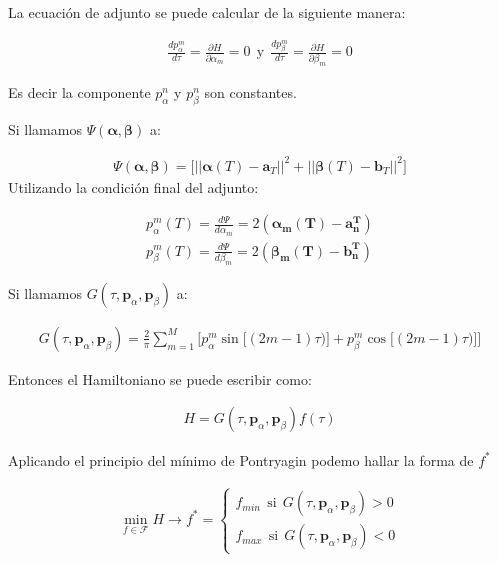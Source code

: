 La ecuación de adjunto se puede calcular de la siguiente manera:

\begin{gather}
    \frac{d p_\alpha^m}{d \tau} = \frac{\partial H }{\partial \alpha_m} = 0 \ \ \text{y} \ \    \frac{d p_\beta^m}{d \tau} = \frac{\partial H }{\partial \beta_m} = 0  
\end{gather}

Es decir la componente $p_\alpha^n$ y $p_\beta^n$ son constantes.
\newline

Si llamamos $\Psi(\bm{\alpha},\bm{\beta})$ a:

\begin{gather}
    \Psi(\bm{\alpha},\bm{\beta}) = \big[  || \bm{\alpha}(T) - \bm{a}_T ||^2  + || \bm{\beta}(T) - \bm{b}_T ||^2 \big]
\end{gather}
Utilizando la condición final del adjunto:

\begin{gather}
    p_\alpha^m(T) = \frac{d\Psi}{d\alpha_m} = 2(\bm{\alpha_m(T) - \bm{a}^T_n})\\
    p_\beta^m(T) = \frac{d\Psi}{d\beta_m} = 2(\bm{\beta_m(T) - \bm{b}^T_n})
\end{gather}


Si llamamos $G(\tau,\bm{p}_\alpha,\bm{p}_\beta)$ a:

\begin{gather}
    G(\tau,\bm{p}_\alpha,\bm{p}_\beta) =  \frac{2}{\pi}\sum_{m=1}^M \Bigg[  p_\alpha^m   \sin \big[(2m-1)\tau)\big] 
    + p_\beta^m   \cos \big[ (2m-1)\tau)\big] \Bigg]
\end{gather}

Entonces el Hamiltoniano se puede escribir como: 

\begin{gather}
    H = G(\tau,\bm{p}_\alpha,\bm{p}_\beta) f(\tau)
\end{gather}

Aplicando el principio del mínimo de Pontryagin podemo hallar la forma de $f^*$ 

\begin{gather}
    \min_{f \in \mathcal{F}} H \rightarrow f^* = \begin{cases}
        f_{min} \ \  \text{si} \ \ G(\tau,\bm{p}_\alpha,\bm{p}_\beta) > 0  \\
        f_{max} \ \ \text{si}  \ \ G(\tau,\bm{p}_\alpha,\bm{p}_\beta) < 0  
    \end{cases}
\end{gather}


